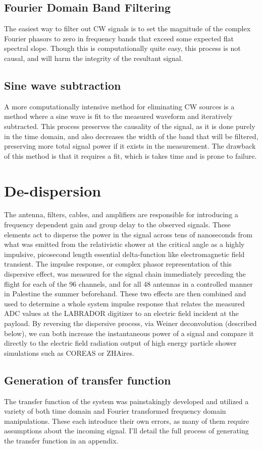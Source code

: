 	\subsection{Fourier Domain Band Filtering}
			The easiest way to filter out CW signals is to set the magnitude of the complex Fourier phasors to zero in frequency bands that exceed some expected flat spectral slope.  Though this is computationally quite easy, this process is not causal, and will harm the integrity of the resultant signal.
		\subsection{Sine wave subtraction}
			A more computationally intensive method for eliminating CW sources is a method where a sine wave is fit to the measured waveform and iteratively subtracted.  This process preserves the causality of the signal, as it is done purely in the time domain, and also decreases the width of the band that will be filtered, preserving more total signal power if it exists in the measurement.  The drawback of this method is that it requires a fit, which is takes time and is prone to failure.


\section{De-dispersion}
	The antenna, filters, cables, and amplifiers are responsible for introducing a frequency dependent gain and group delay to the observed signals.  These elements act to disperse the power in the signal across tens of nanoseconds from what was emitted from the relativistic shower at the critical angle as a highly impulsive, picosecond length essential delta-function like electromagnetic field transient.  The impulse response, or complex phasor representation of this dispersive effect, was measured for the signal chain immediately preceding the flight for each of the 96 channels, and for all 48 antennas in a controlled manner in Palestine the summer beforehand.  These two effects are then combined and used to determine a whole system impulse response that relates the measured ADC values at the LABRADOR digitizer to an electric field incident at the payload.  By reversing the dispersive process, via Weiner deconvolution (described below), we can both increase the instantaneous power of a signal and compare it directly to the electric field radiation output of high energy particle shower simulations such as COREAS or ZHAires.
	\subsection{Generation of transfer function}
		The transfer function of the system was painstakingly developed and utilized a variety of both time domain and Fourier transformed frequency domain manipulations.  These each introduce their own errors, as many of them require assumptions about the incoming signal.  I'll detail the full process of generating the transfer function in an appendix.
